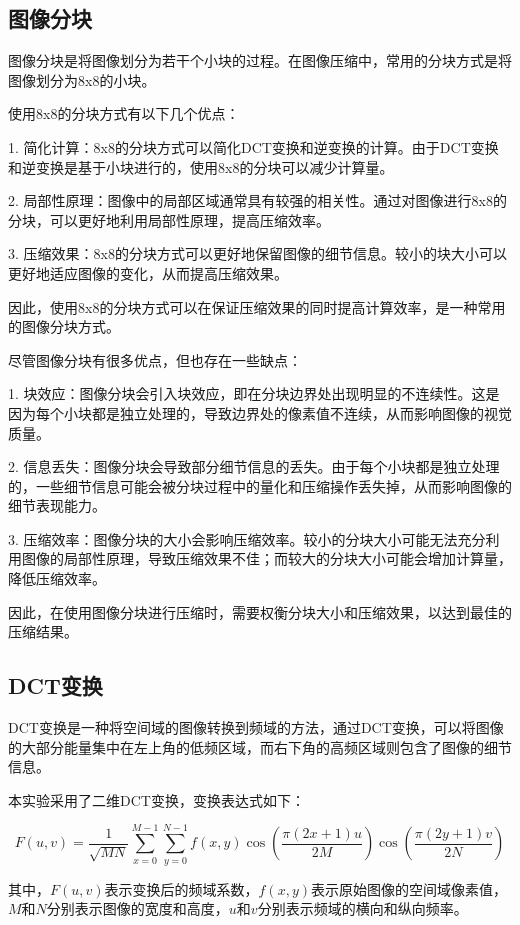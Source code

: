 \documentclass{article}
\begin{document}
\subsection{图像分块}

图像分块是将图像划分为若干个小块的过程。在图像压缩中，常用的分块方式是将图像划分为8x8的小块。

使用8x8的分块方式有以下几个优点：

1. 简化计算：8x8的分块方式可以简化DCT变换和逆变换的计算。由于DCT变换和逆变换是基于小块进行的，使用8x8的分块可以减少计算量。

2. 局部性原理：图像中的局部区域通常具有较强的相关性。通过对图像进行8x8的分块，可以更好地利用局部性原理，提高压缩效率。

3. 压缩效果：8x8的分块方式可以更好地保留图像的细节信息。较小的块大小可以更好地适应图像的变化，从而提高压缩效果。

因此，使用8x8的分块方式可以在保证压缩效果的同时提高计算效率，是一种常用的图像分块方式。

尽管图像分块有很多优点，但也存在一些缺点：

1. 块效应：图像分块会引入块效应，即在分块边界处出现明显的不连续性。这是因为每个小块都是独立处理的，导致边界处的像素值不连续，从而影响图像的视觉质量。

2. 信息丢失：图像分块会导致部分细节信息的丢失。由于每个小块都是独立处理的，一些细节信息可能会被分块过程中的量化和压缩操作丢失掉，从而影响图像的细节表现能力。

3. 压缩效率：图像分块的大小会影响压缩效率。较小的分块大小可能无法充分利用图像的局部性原理，导致压缩效果不佳；而较大的分块大小可能会增加计算量，降低压缩效率。

因此，在使用图像分块进行压缩时，需要权衡分块大小和压缩效果，以达到最佳的压缩结果。

\subsection{DCT变换}

DCT变换是一种将空间域的图像转换到频域的方法，通过DCT变换，可以将图像的大部分能量集中在左上角的低频区域，而右下角的高频区域则包含了图像的细节信息。

本实验采用了二维DCT变换，变换表达式如下：

\[
F(u,v) = \frac{1}{\sqrt{MN}} \sum_{x=0}^{M-1} \sum_{y=0}^{N-1} f(x,y) \cos\left(\frac{\pi(2x+1)u}{2M}\right) \cos\left(\frac{\pi(2y+1)v}{2N}\right)
\]

其中，$F(u,v)$表示变换后的频域系数，$f(x,y)$表示原始图像的空间域像素值，$M$和$N$分别表示图像的宽度和高度，$u$和$v$分别表示频域的横向和纵向频率。
\end{document}
